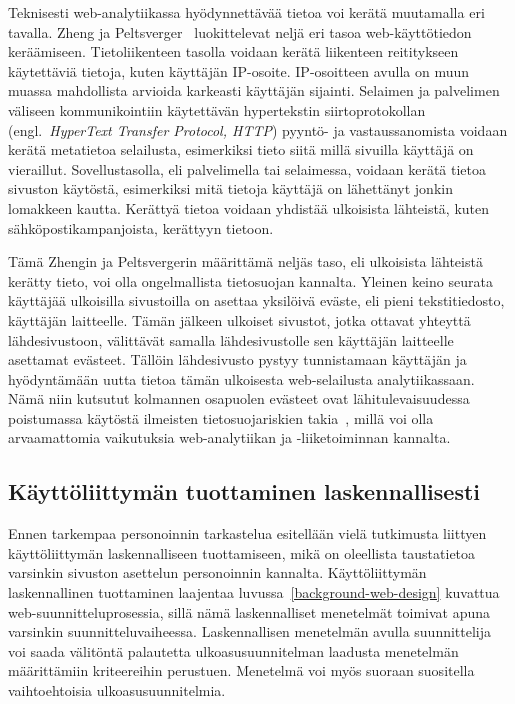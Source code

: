 \documentclass[finnish, 12pt, a4paper, elec, utf8, a-1b, online]{aaltothesis}
\begin{document}
Teknisesti web-analytiikassa hyödynnettävää tietoa voi kerätä muutamalla eri
tavalla. Zheng ja Peltsverger~\cite{zheng2015web} luokittelevat neljä eri tasoa
web-käyttötiedon keräämiseen. Tietoliikenteen tasolla voidaan kerätä liikenteen
reititykseen käytettäviä tietoja, kuten käyttäjän IP-osoite. IP-osoitteen avulla
on muun muassa mahdollista arvioida karkeasti käyttäjän sijainti. Selaimen ja
palvelimen väliseen kommunikointiin käytettävän hypertekstin siirtoprotokollan
(engl.~\textit{HyperText Transfer Protocol, HTTP}) pyyntö- ja vastaussanomista
voidaan kerätä metatietoa selailusta, esimerkiksi tieto siitä millä sivuilla
käyttäjä on vieraillut. Sovellustasolla, eli palvelimella tai selaimessa,
voidaan kerätä tietoa sivuston käytöstä, esimerkiksi mitä tietoja käyttäjä on
lähettänyt jonkin lomakkeen kautta. Kerättyä tietoa voidaan yhdistää ulkoisista
lähteistä, kuten sähköpostikampanjoista, kerättyyn tietoon.

Tämä Zhengin ja Peltsvergerin määrittämä neljäs taso, eli ulkoisista lähteistä
kerätty tieto, voi olla ongelmallista tietosuojan kannalta. Yleinen keino
seurata käyttäjää ulkoisilla sivustoilla on asettaa yksilöivä eväste, eli pieni
tekstitiedosto, käyttäjän laitteelle. Tämän jälkeen ulkoiset sivustot, jotka
ottavat yhteyttä lähdesivustoon, välittävät samalla lähdesivustolle sen
käyttäjän laitteelle asettamat evästeet. Tällöin lähdesivusto pystyy
tunnistamaan käyttäjän ja hyödyntämään uutta tietoa tämän ulkoisesta
web-selailusta analytiikassaan. Nämä niin kutsutut kolmannen osapuolen evästeet
ovat lähitulevaisuudessa poistumassa käytöstä ilmeisten tietosuojariskien
takia~\cite{third-party-cookies-phaseout}, millä voi olla arvaamattomia
vaikutuksia web-analytiikan ja -liiketoiminnan kannalta.

\subsection{Käyttöliittymän tuottaminen laskennallisesti}

Ennen tarkempaa personoinnin tarkastelua esitellään vielä tutkimusta liittyen
käyttöliittymän laskennalliseen tuottamiseen, mikä on oleellista taustatietoa
varsinkin sivuston asettelun personoinnin kannalta. Käyttöliittymän
laskennallinen tuottaminen laajentaa luvussa~\ref{background-web-design}
kuvattua web-suunnitteluprosessia, sillä nämä laskennalliset menetelmät toimivat
apuna varsinkin suunnitteluvaiheessa. Laskennallisen menetelmän avulla
suunnittelija voi saada välitöntä palautetta ulkoasusuunnitelman laadusta
menetelmän määrittämiin kriteereihin perustuen. Menetelmä voi myös suoraan
suositella vaihtoehtoisia ulkoasusuunnitelmia.
\end{document}

